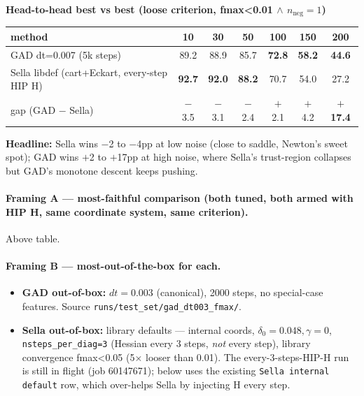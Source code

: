 \documentclass[11pt]{article}
\begin{document}
\begin{center}\small
\textbf{Head-to-head best vs best (loose criterion, fmax<0.01 $\wedge$ $n_{\text{neg}}{=}1$)} \\[0.3em]
\begin{tabular}{l|cccccc}
\toprule
method                                            & 10 & 30 & 50 & 100 & 150 & 200 \\
\midrule
GAD dt=0.007 (5k steps)                           & 89.2 & 88.9 & 85.7 & \textbf{72.8} & \textbf{58.2} & \textbf{44.6} \\
Sella libdef (cart+Eckart, every-step HIP H)      & \textbf{92.7} & \textbf{92.0} & \textbf{88.2} & 70.7 & 54.0 & 27.2 \\
\midrule
gap (GAD $-$ Sella)                                & $-$3.5 & $-$3.1 & $-$2.4 & $+$2.1 & $+$4.2 & $+$\textbf{17.4} \\
\bottomrule
\end{tabular}
\end{center}

\textbf{Headline:} Sella wins $-$2 to $-$4pp at low noise (close to
saddle, Newton's sweet spot); GAD wins $+$2 to $+$17pp at high noise,
where Sella's trust-region collapses but GAD's monotone descent keeps
pushing.

\paragraph{Framing A — most-faithful comparison (both tuned, both armed
with HIP H, same coordinate system, same criterion).} Above table.

\paragraph{Framing B — most-out-of-the-box for each.}
\begin{itemize}[leftmargin=1.5em]
\item \textbf{GAD out-of-box:} $dt=0.003$ (canonical), 2000 steps, no
  special-case features. Source \texttt{runs/test\_set/gad\_dt003\_fmax/}.
\item \textbf{Sella out-of-box:} library defaults — internal coords,
  $\delta_0{=}0.048, \gamma{=}0$, \texttt{nsteps\_per\_diag=3}
  (Hessian every 3 steps, \emph{not} every step), library convergence
  fmax<0.05 (5$\times$ looser than 0.01). The every-3-steps-HIP-H run
  is still in flight (job 60147671); below uses the existing
  \texttt{Sella internal default} row, which over-helps Sella by
  injecting H every step.
\end{itemize}
\end{document}
